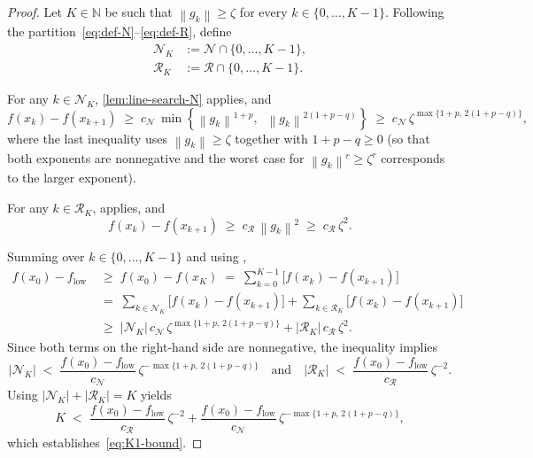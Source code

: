 \documentclass[11pt,a4paper]{article}
\theoremstyle{plain}
\theoremstyle{definition}
\newcommand{\N}{\mathbb{N}}
\newcommand{\norm}[1]{\left\|#1\right\|}
\newcommand{\flow}{f_{\mathrm{low}}}
\newcommand{\setN}{\mathcal{N}}
\newcommand{\setR}{\mathcal{R}}
\newcommand{\cN}{c_{\setN}}
\begin{document}
\begin{proof}
Let $K \in \N$ be such that $\norm{g_{k}} \geq \zeta$ for every $k \in \{0, \dots, K-1\}$. Following the partition~\eqref{eq:def-N}--\eqref{eq:def-R}, define
\begin{align*}
\setN_{K} &:= \setN \cap \{0, \dots, K-1\}, \\
\setR_{K} &:= \setR \cap \{0, \dots, K-1\}.
\end{align*}

For any $k \in \setN_{K}$, \cref{lem:line-search-N} applies, and
\begin{equation}\label{eq:r1-decrease-N}
f(x_{k}) - f(x_{k+1}) \;\geq\; \cN\,\min\!\left\{ \norm{g_{k}}^{1+p},\;\; \norm{g_{k}}^{2(1+p-q)} \right\}
\;\geq\; \cN\,\zeta^{\max\{1+p,\,2(1+p-q)\}},
\end{equation}
where the last inequality uses $\norm{g_{k}} \geq \zeta$ together with $1 + p - q \geq 0$ (so that both exponents are nonnegative and the worst case for $\norm{g_{k}}^{r} \geq \zeta^{r}$ corresponds to the larger exponent).

For any $k \in \setR_{K}$,  applies, and
\begin{equation}\label{eq:r1-decrease-R}
f(x_{k}) - f(x_{k+1}) \;\geq\; c_{\setR}\,\norm{g_{k}}^{2} \;\geq\; c_{\setR}\,\zeta^{2}.
\end{equation}

Summing over $k \in \{0, \dots, K-1\}$ and using ,
\begin{align*}
f(x_{0}) - \flow
&\;\geq\; f(x_{0}) - f(x_{K}) \;=\; \sum_{k=0}^{K-1} \bigl[f(x_{k}) - f(x_{k+1})\bigr] \\
&\;=\; \sum_{k \in \setN_{K}} \bigl[f(x_{k}) - f(x_{k+1})\bigr]
+ \sum_{k \in \setR_{K}} \bigl[f(x_{k}) - f(x_{k+1})\bigr] \\
&\;\geq\; |\setN_{K}|\,\cN\,\zeta^{\max\{1+p,\,2(1+p-q)\}}
+ |\setR_{K}|\,c_{\setR}\,\zeta^{2}.
\end{align*}
Since both terms on the right-hand side are nonnegative, the inequality implies
\begin{equation*}
|\setN_{K}| \;<\; \frac{f(x_{0}) - \flow}{\cN}\,\zeta^{-\max\{1+p,\,2(1+p-q)\}}
\quad\text{and}\quad
|\setR_{K}| \;<\; \frac{f(x_{0}) - \flow}{c_{\setR}}\,\zeta^{-2}.
\end{equation*}
Using $|\setN_{K}| + |\setR_{K}| = K$ yields
\begin{equation*}
K \;<\; \frac{f(x_{0}) - \flow}{c_{\setR}}\,\zeta^{-2}
+ \frac{f(x_{0}) - \flow}{\cN}\,\zeta^{-\max\{1+p,\,2(1+p-q)\}},
\end{equation*}
which establishes~\eqref{eq:K1-bound}.
\end{proof}
\end{document}
